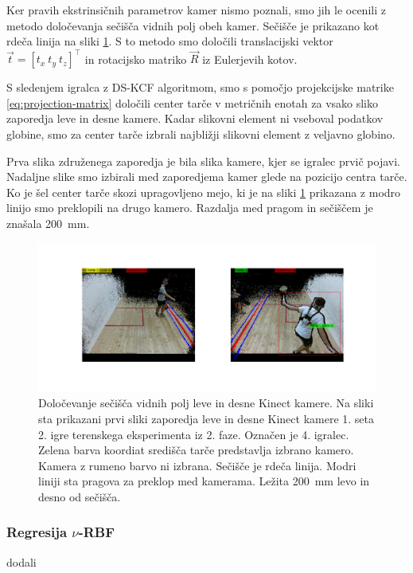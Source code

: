 Ker pravih ekstrinsičnih parametrov kamer nismo poznali, smo jih le ocenili z metodo določevanja sečišča vidnih polj obeh kamer. Sečišče je prikazano kot rdeča linija na sliki \ref{fig:zdruzevanje}. S to metodo smo določili translacijski vektor $\vec{t} = \left [ t_x~ t_y~ t_z \right]^\top$ in rotacijsko matriko $\vec{R}$ iz Eulerjevih kotov.

S sledenjem igralca z DS-KCF algoritmom, smo s pomočjo projekcijske matrike \eqref{eq:projection-matrix} določili center tarče v metričnih enotah za vsako sliko zaporedja leve in desne kamere. Kadar slikovni element ni vseboval podatkov globine, smo za center tarče izbrali najbližji slikovni element z veljavno globino.

Prva slika združenega zaporedja je bila slika kamere, kjer se igralec prvič pojavi. Nadaljne slike smo izbirali med zaporedjema kamer glede na pozicijo centra tarče. Ko je šel center tarče skozi upragovljeno mejo, ki je na sliki \ref{fig:zdruzevanje} prikazana z modro linijo smo preklopili na drugo kamero. Razdalja med pragom in sečiščem je znašala \SI{200}{mm}.


\begin{figure}[htb]
	\centering
	\includegraphics[width=\columnwidth]{./Slike/zdruzevanje-example.png}
	\caption[Določevanje sečišča vidnih polj leve in desne Kinect kamere]{Določevanje sečišča vidnih polj leve in desne Kinect kamere. Na sliki sta prikazani prvi sliki zaporedja leve in desne Kinect kamere 1. seta 2. igre terenskega eksperimenta iz 2. faze. Označen je 4. igralec. Zelena barva koordiat središča tarče predstavlja izbrano kamero. Kamera z rumeno barvo ni izbrana. Sečišče je rdeča linija. Modri liniji sta pragova za preklop med kamerama. Ležita \SI{200}{mm} levo in desno od sečišča.}
	\label{fig:zdruzevanje}
\end{figure}





\subsubsection{Regresija \texorpdfstring{$\nu$}{nu}-RBF}
dodali 



